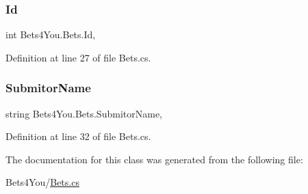 \subsubsection{\texorpdfstring{Id}{Id}}
{\footnotesize\ttfamily int Bets4\+You.\+Bets.\+Id\hspace{0.3cm}{\ttfamily [get]}, {\ttfamily [set]}}



Definition at line 27 of file Bets.\+cs.

\mbox{\label{class_bets4_you_1_1_bets_a6d12e2805d6ad58f802c016e7447a8bb}} 
\subsubsection{\texorpdfstring{SubmitorName}{SubmitorName}}
{\footnotesize\ttfamily string Bets4\+You.\+Bets.\+Submitor\+Name\hspace{0.3cm}{\ttfamily [get]}, {\ttfamily [set]}}



Definition at line 32 of file Bets.\+cs.



The documentation for this class was generated from the following file\+:\begin{DoxyCompactItemize}
\item 
Bets4\+You/\mbox{\hyperlink{_bets_8cs}{Bets.\+cs}}\end{DoxyCompactItemize}
